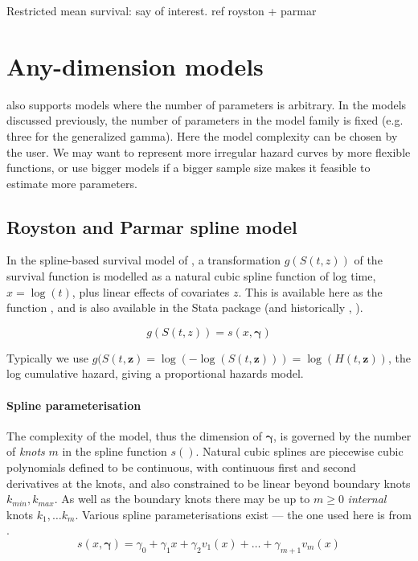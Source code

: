 \documentclass[nojss,nofooter]{jss}
\begin{document}
Restricted mean survival: say of interest. ref royston + parmar


\section{Any-dimension models}

 also supports models where the number of parameters is
arbitrary.  In the models discussed previously, the number of
parameters in the model family is fixed (e.g. three for the
generalized gamma).  Here the model complexity can be chosen by the
user.  We may want to represent more irregular hazard
curves by more flexible functions, or use bigger models if a bigger
sample size makes it feasible to estimate more parameters.


\subsection{Royston and Parmar spline model}

In the spline-based survival model of \citet{royston:parmar}, a
transformation $g(S(t,z))$ of the survival function is modelled as a
natural cubic spline function of log time, $x = \log(t)$, plus linear
effects of covariates $z$.  This is available here as the function
,  and is also available in the Stata package
 \citep{stpm2} (and historically , \citet{stpm:orig,stpm:update}).

  \[g(S(t,z)) = s(x, \bm{\gamma})\]

Typically we use $g(S(t,\mathbf{z}) = \log(-\log(S(t,\mathbf{z}))) =
\log(H(t,\mathbf{z}))$, the log cumulative hazard, giving a
proportional hazards model.    

\paragraph{Spline parameterisation}
The complexity of the model, thus the dimension of $\bm{\gamma}$, is
governed by the number of \emph{knots} $m$ in the spline function
$s()$.  Natural cubic splines are piecewise cubic polynomials defined
to be continuous, with continuous first and second derivatives at the
knots, and also constrained to be linear beyond boundary knots
$k_{min},k_{max}$.  As well as the boundary knots there may be up to
$m\geq 0$ \emph{internal} knots $k_1,\ldots k_m$.  Various spline
parameterisations exist --- the one used here is from
\citet{royston:parmar}.
\begin{equation}
  \label{eq:spline}
  s(x,\bm{\gamma}) = \gamma_0 + \gamma_1 x + \gamma_2 v_1(x) + \ldots + \gamma_{m+1} v_m(x)   
\end{equation}
\end{document}
